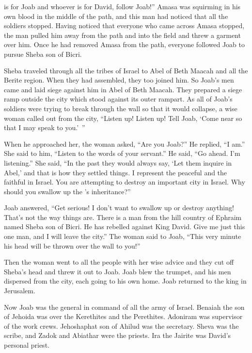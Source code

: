 {is for Joab
and whoever is
for David,
follow
Joab!”
Amasa
was squirming
in his own blood
in the middle
of the path,
and this man
had noticed
that
all
the
soldiers
stopped.
Having noticed
that
everyone
who came
across
Amasa stopped,
the man pulled
him
away from
the path
and into the field
and threw
a garment
over him.
Once he had removed
Amasa
from
the path,
everyone
followed
Joab
to pursue
Sheba
son
of Bicri.
\par }{\PP {}Sheba traveled
through all
the tribes
of Israel
to Abel
of Beth Maacah
and all
the Berite
region. When they had assembled,
they too
joined him.
So Joab’s men came
and laid siege against
him in
Abel
of Beth Maacah.
They prepared
a siege ramp
outside
the city
which stood
against its outer rampart.
As all
of Joab’s
soldiers
were trying to break through
the wall
so that it would collapse,
a wise
woman
called
out from
the city,
“Listen
up! Listen
up! Tell
Joab,
‘Come
near
so that I may speak
to you.’ ”
\par }{\PP {}When he approached
her,
the woman
asked,
“Are you
Joab?” He replied,
“I am.”
She said
to him, “Listen
to the words
of your servant.”
He said,
“Go ahead. I’m
listening.”
She said,
“In the past
they would
always say,
‘Let them inquire
in Abel,’
and that is how they settled things.
I
represent the peaceful
and the faithful
in Israel.
You
are attempting
to destroy
an important
city
in Israel.
Why
should you swallow up
the
{}’s
inheritance?”
\par }{\PP {}Joab
answered,
“Get serious! I don’t
want to swallow up
or
destroy anything!
That’s
not
the way
things
are. There is a man
from the hill country
of Ephraim
named
Sheba
son
of Bicri.
He has rebelled against King
David.
Give
me just this one man, and I will leave
the city.”
The woman
said
to
Joab,
“This
very minute
his head
will be thrown
over the wall
to you!”
\par }{\PP {}Then the woman
went
to
all
the people
with her wise advice
and they cut off
Sheba’s
head
and threw
it out
to
Joab.
Joab blew the trumpet, and his men dispersed from the city, each going to his own home. Joab returned to the king in Jerusalem.
\par }{\PP {}Now Joab
was the general
in command
of all
the army
of Israel.
Benaiah
the son
of Jehoida
was over
the Kerethites
and the Perethites.
Adoniram
was supervisor
of the work crews.
Jehoshaphat
son
of Ahilud
was the secretary.
Sheva
was the scribe,
and Zadok
and Abiathar
were the priests.
Ira
the Jairite
was
David’s
personal priest.

}
